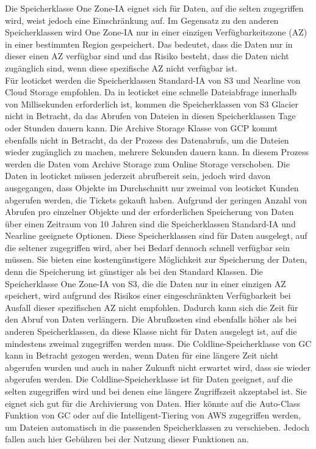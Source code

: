 Die Speicherklasse One Zone-IA eignet sich für Daten, auf die selten zugegriffen wird, weist jedoch eine Einschränkung auf. Im Gegensatz zu den anderen Speicherklassen wird One Zone-IA nur in einer einzigen Verfügbarkeitszone (AZ) in einer bestimmten Region gespeichert. Das bedeutet, dass die Daten nur in dieser einen AZ verfügbar sind und das Risiko besteht, dass die Daten nicht zugänglich sind, wenn diese spezifische AZ nicht verfügbar ist.\\

Für leoticket werden die Speicherklassen Standard-IA von S3 und Nearline von Cloud Storage empfohlen. Da in leoticket eine schnelle Dateiabfrage innerhalb von Millisekunden erforderlich ist, kommen die Speicherklassen von S3 Glacier nicht in Betracht, da das Abrufen von Dateien in diesen Speicherklassen Tage oder Stunden dauern kann. Die Archive Storage Klasse von GCP kommt ebenfalls nicht in Betracht, da der Prozess des Datenabrufs, um die Dateien wieder zugänglich zu machen, mehrere Sekunden dauern kann. In diesem Prozess werden die Daten vom Archive Storage zum Online Storage verschoben. Die Daten in leoticket müssen jederzeit abrufbereit sein, jedoch wird davon ausgegangen, dass Objekte im Durchschnitt nur zweimal von leoticket Kunden abgerufen werden, die Tickets gekauft haben. Aufgrund der geringen Anzahl von Abrufen pro einzelner Objekte und der erforderlichen Speicherung von Daten über einen Zeitraum von 10 Jahren sind die Speicherklassen Standard-IA und Nearline geeignete Optionen. Diese Speicherklassen sind für Daten ausgelegt, auf die seltener zugegriffen wird, aber bei Bedarf dennoch schnell verfügbar sein müssen. Sie bieten eine kostengünstigere Möglichkeit zur Speicherung der Daten, denn die Speicherung ist günstiger als bei den Standard Klassen. Die Speicherklasse One Zone-IA von S3, die die Daten nur in einer einzigen AZ speichert, wird aufgrund des Risikos einer eingeschränkten Verfügbarkeit bei Ausfall dieser spezifischen AZ nicht empfohlen. Dadurch kann sich die Zeit für den Abruf von Daten verlängern. Die Abrufkosten sind ebenfalls höher als bei anderen Speicherklassen, da diese Klasse nicht für Daten ausgelegt ist, auf die mindestens zweimal zugegriffen werden muss. Die Coldline-Speicherklasse von GC kann in Betracht gezogen werden, wenn Daten für eine längere Zeit nicht abgerufen wurden und auch in naher Zukunft nicht erwartet wird, dass sie wieder abgerufen werden. Die Coldline-Speicherklasse ist für Daten geeignet, auf die selten zugegriffen wird und bei denen eine längere Zugriffszeit akzeptabel ist. Sie eignet sich gut für die Archivierung von Daten. Hier könnte auf die Auto-Class Funktion von GC oder auf die Intelligent-Tiering von AWS zugegriffen werden, um Dateien automatisch in die passenden Speicherklassen zu verschieben. Jedoch fallen auch hier Gebühren bei der Nutzung dieser Funktionen an.\\


